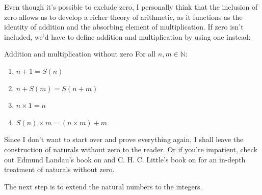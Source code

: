Even though it's possible to exclude zero, I personally think that the inclusion of zero allows us
to develop a richer theory of arithmetic, as it functions as the identity of addition and the
absorbing element of multiplication. If zero isn't included, we'd have to define addition and
multiplication by using one instead:

\begin{df}{Addition and multiplication without zero}{}
  For all \(n, m \in \mathbb{N}\):
  \begin{enumerate}[noitemsep]
    \item \(n + 1 = S(n)\)
    \item \(n + S(m) = S(n + m)\)
    \item \(n \times 1 = n\)
    \item \(S(n) \times m = (n \times m) + m\)
  \end{enumerate}
\end{df}

Since I don't want to start over and prove everything again, I shall leave the construction of
naturals without zero to the reader. Or if you're impatient, check out Edmund Landau's book on
 \cite{landau-2001} and C. H. C. Little's book on 
\cite{little-2003} for an in-depth treatment of naturals without zero.

The next step is to extend the natural numbers to the integers.
